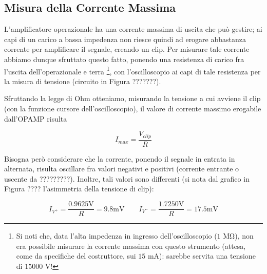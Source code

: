 \subsection{Misura della Corrente Massima}

L'amplificatore operazionale ha una corrente massima di uscita che può gestire; ai capi di un carico a bassa impedenza non riesce quindi ad erogare abbastanza corrente per amplificare il segnale, creando un clip. Per misurare tale corrente abbiamo dunque sfruttato questo fatto, ponendo una resistenza di carico fra l'uscita dell'operazionale e terra \footnote{Si noti che, data l'alta impedenza in ingresso dell'oscilloscopio ($1$ \si{\mega\ohm}), non era possibile misurare la corrente massima con questo strumento (attesa, come da specifiche del costruttore, sui $15$ \si{\milli\ampere}): sarebbe servita una tensione di $15000$ \si{\volt}!}, con l'oscilloscopio ai capi di tale resistenza per la misura di tensione (circuito in Figura ???????).

Sfruttando la legge di Ohm otteniamo, misurando la tensione a cui avviene il clip (con la funzione cursore dell'oscilloscopio), il valore di corrente massimo erogabile dall'OPAMP risulta

$$I_{max} = \frac{V_{clip}}{R}$$

Bisogna però considerare che la corrente, ponendo il segnale in entrata in alternata, risulta oscillare fra valori negativi e positivi (corrente entrante o uscente da ?????????). Inoltre, tali valori sono differenti (si nota dal grafico in Figura ???? l'asimmetria della tensione di clip):

$$I_{V^+} = \frac{0.9625 \si{\volt}}{R} = 9.8 \si{\milli\volt}  \qquad I_{V^-} = \frac{1.7250 \si{\volt}}{R} = 17.5 \si{\milli\volt}$$